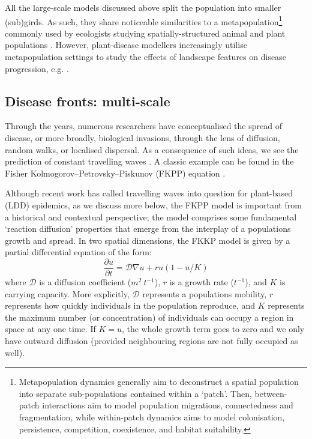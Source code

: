 All the large-scale models discussed above split the population into smaller (sub)girds.
As such, they share noticeable similarities to a metapopulation\footnote{
Metapopulation dynamics generally aim to deconstruct a spatial population into separate sub-populations
contained within a `patch'. Then, between-patch interactions aim to model population migrations, 
connectedness and fragmentation, while within-patch dynamics aims to model colonisation, persistence,
competition, coexistence, and habitat suitability.} commonly used by ecologists studying spatially-structured
animal and plant populations \cite{hanski1998metapopulation}. However, plant-disease modellers increasingly
utilise metapopulation settings to study the effects of landscape features on disease progression,
e.g. \cite{beninca2020trade, soubeyrand2009spatiotemporal, doi:10.1046/j.1461-0248.2002.00378.x}.

\subsection{Disease fronts: multi-scale}

Through the years, numerous researchers have conceptualised the spread of disease, or more broadly, biological invasions, 
through the lens of diffusion, random walks, or localised dispersal. As a consequence of such ideas, we see the prediction
of constant travelling waves \cite{skellam1951random, mollison1977spatial, GRASSBERGER1983157, ferrandino1993dispersive}.
A classic example can be found in the Fisher Kolmogorov–Petrovsky–Piskunov (FKPP) equation \cite{fisher1937wave}.

Although recent work has called travelling waves into question for plant-based (LDD) epidemics, as we discuss more below, 
the FKPP model is important from a historical and contextual perspective;
the model comprises some fundamental `reaction diffusion' properties that emerge from the interplay of a populations growth and spread.
In two spatial dimensions, the FKKP model is given by a partial differential equation of the form:
\begin{equation}
\label{eq:fkpp}
    \frac{\partial u}{\partial t} = \mathcal{D}\nabla u + ru(1 - u/K)
\end{equation}
where $\mathcal{D}$ is a diffusion coefficient ($m^2\ t^{-1}$), $r$ is a growth rate ($t^{-1}$),
and $K$ is carrying capacity. More explicitly, $\mathcal{D}$ represents a populations mobility, 
$r$ represents how quickly individuals in the population reproduce, and $K$ represents 
the maximum number (or concentration) of individuals can occupy a region in space at any one time.
If $K=u$, the whole growth term goes to zero and we only have outward diffusion (provided neighbouring
regions are not fully occupied as well). 

